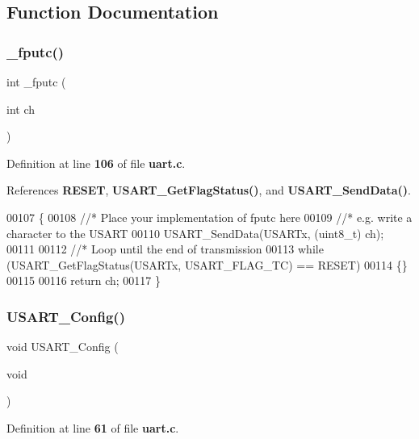 \subsection{Function Documentation}
\mbox{\label{uart_8c_a7aa3de78846f1479812044ae59014146}} 
\subsubsection{\+\_\+fputc()}
{\footnotesize\ttfamily int \+\_\+fputc (\begin{DoxyParamCaption}\item[{int}]{ch }\end{DoxyParamCaption})}



Definition at line \textbf{ 106} of file \textbf{ uart.\+c}.



References \textbf{ R\+E\+S\+ET}, \textbf{ U\+S\+A\+R\+T\+\_\+\+Get\+Flag\+Status()}, and \textbf{ U\+S\+A\+R\+T\+\_\+\+Send\+Data()}.


\begin{DoxyCode}
00107 \{
00108   \textcolor{comment}{//* Place your implementation of fputc here }
00109   \textcolor{comment}{//* e.g. write a character to the USART }
00110   USART_SendData(USARTx, (uint8\_t) ch);
00111 
00112   \textcolor{comment}{//* Loop until the end of transmission }
00113   \textcolor{keywordflow}{while} (USART_GetFlagStatus(USARTx, USART_FLAG_TC) == RESET)
00114   \{\}
00115 
00116   \textcolor{keywordflow}{return} ch;
00117 \}
\end{DoxyCode}
\mbox{\label{uart_8c_ae9720bf2dbb461c28e0205b050f1a0bb}} 
\subsubsection{U\+S\+A\+R\+T\+\_\+\+Config()}
{\footnotesize\ttfamily void U\+S\+A\+R\+T\+\_\+\+Config (\begin{DoxyParamCaption}\item[{void}]{ }\end{DoxyParamCaption})}



Definition at line \textbf{ 61} of file \textbf{ uart.\+c}.




